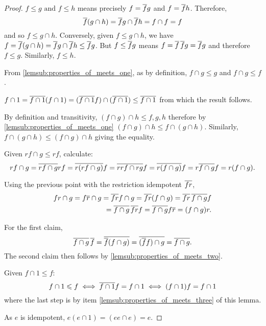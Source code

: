     \begin{proof}
      \bproofenum
        \item $f\le g \text{ and } f \le h$ means precisely $f = \overline{f} g$ and $f = \overline{f} h$.
          Therefore,
          \[
            \overline{f} (g\cap h) =  \overline{f} g \cap \overline{f} h =  f\cap f = f
          \]
          and so $f \le g \cap h$. Conversely, given $f \le g\cap h$, we have 
          $f = \overline{f} (g\cap h) = \overline{f} g \cap \overline{f} h \le \overline{f} g $. But 
          $f \le \overline{f} g$ means $f = \overline{f}\,\overline{f} g = \overline{f}g$ and therefore 
          $f \le g$. Similarly, $f \le h$.
        \item From \ref{lemsub:properties_of_meets_one}, as by definition, $f\cap g \le g$ and 
          $f \cap g \le f$.
        \item $f\cap 1 = \overline{f\cap 1} (f \cap 1)= (\overline{f \cap 1} f ) \cap (\overline{f \cap 1})
          \le \overline{f \cap 1}$ from which the result follows. %
        \item By definition and transitivity, $(f\cap g)\cap h \le f, g, h$ therefore by 
          \ref{lemsub:properties_of_meets_one} $(f \cap g) \cap h \le f \cap (g \cap h)$. Similarly, 
          $f \cap (g \cap h) \le(f \cap g) \cap h$ giving the equality.
        \item Given  $r f \cap g \le r f$, calculate:
          \[
            r f\cap g
            = \overline{r f\cap g} r f
            = \overline{r (r f\cap g)} f
            = \overline{r r f\cap r g} f
            = \overline{r (f\cap g)} f
            = r \overline{f\cap g} f
            = r (f\cap g).
          \]
        \item Using the previous point with the restriction idempotent $\overline{f r}$,
          \begin{equation*}
            \begin{split}
              f r \cap g
              = f \restr{r} \cap g   %
              = \restr{f r }f \cap g  %
              = \restr{f r}(f\cap g)   %
              = \restr{f r}\, \restr{f\cap g} f \\ %
              = \restr{f\cap g}\, \restr{f r} f %
              = \restr{f\cap g} f \restr{r}  %
              = (f\cap g) r. %
            \end{split}
          \end{equation*}
        \item For the first claim,
          \[
            \overline{f\cap g}\, \overline{f} =\overline{\overline{f}(f\cap g)}\\
            =\overline{(\overline{f}f)\cap g} =\overline{f\cap g}.
          \]
          The second claim then follows by \ref{lemsub:properties_of_meets_two}.
        \item Given $ f \cap 1 \leq f$:
          \[ 
            f \cap 1 \leqslant f \iff  \overline{f \cap 1} f = f \cap 1 \iff  (f \cap 1) f = f \cap 1
          \]
          where the last step is by item \ref{lemsub:properties_of_meets_three} of this lemma.
        \item As $e$ is idempotent, $e (e\cap 1) = (e e \cap e) = e$.
      \eproofenum
    \end{proof}
